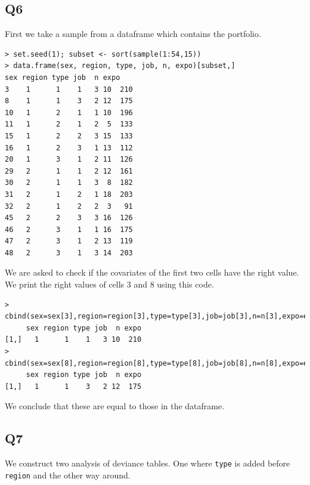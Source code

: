 \documentclass[11pt]{article}
\begin{document}
\subsection*{Q6}

First we take a sample from a dataframe which contains the portfolio.

\begin{verbatim}
> set.seed(1); subset <- sort(sample(1:54,15))
> data.frame(sex, region, type, job, n, expo)[subset,]
sex region type job  n expo
3    1      1    1   3 10  210
8    1      1    3   2 12  175
10   1      2    1   1 10  196
11   1      2    1   2  5  133
15   1      2    2   3 15  133
16   1      2    3   1 13  112
20   1      3    1   2 11  126
29   2      1    1   2 12  161
30   2      1    1   3  8  182
31   2      1    2   1 18  203
32   2      1    2   2  3   91
45   2      2    3   3 16  126
46   2      3    1   1 16  175
47   2      3    1   2 13  119
48   2      3    1   3 14  203
\end{verbatim}

We are asked to check if the covariates of the first two cells have the right value. We print the right values of cells 3 and 8 using this code.

\begin{verbatim}
> cbind(sex=sex[3],region=region[3],type=type[3],job=job[3],n=n[3],expo=expo[3])
     sex region type job  n expo
[1,]   1      1    1   3 10  210
> cbind(sex=sex[8],region=region[8],type=type[8],job=job[8],n=n[8],expo=expo[8])
     sex region type job  n expo
[1,]   1      1    3   2 12  175
\end{verbatim}

We conclude that these are equal to those in the dataframe.

\subsection*{Q7}

We construct two analysis of deviance tables. One where \verb|type| is added before \verb|region| and the other way around.
\end{document}
